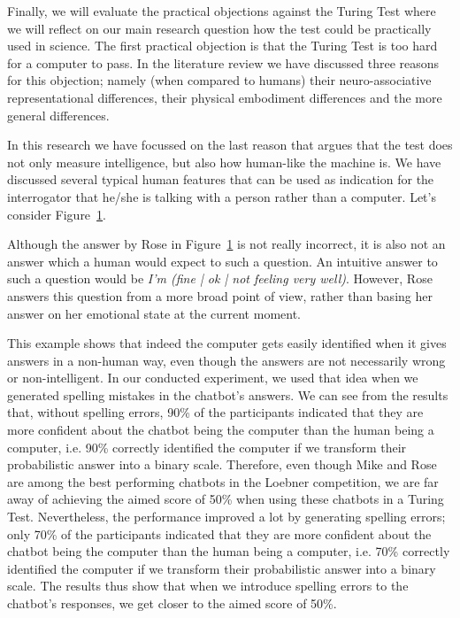 Finally, we will evaluate the practical objections against the Turing Test where we will reflect on our main research question how the test could be practically used in science. The first practical objection is that the Turing Test is too hard for a computer to pass. In the literature review we have discussed three reasons for this objection; namely (when compared to humans) their neuro-associative representational differences, their physical embodiment differences and the more general differences.

In this research we have focussed on the last reason that argues that the test does not only measure intelligence, but also how human-like the machine is. We have discussed several typical human features that can be used as indication for the interrogator that he/she is talking with a person rather than a computer. Let’s consider Figure~\ref{Example3}.

\begin{figure}[ht]
   \begin{center}
   \end{center}
   \caption{}
   \label{Example3}
\end{figure}

Although the answer by Rose in Figure~\ref{Example3} is not really incorrect, it is also not an answer which a human would expect to such a question. An intuitive answer to such a question would be \textit{I'm (fine | ok | not feeling very well)}. However, Rose answers this question from a more broad point of view, rather than basing her answer on her emotional state at the current moment.

This example shows that indeed the computer gets easily identified when it gives answers in a non-human way, even though the answers are not necessarily wrong or non-intelligent. In our conducted experiment, we used that idea when we generated spelling mistakes in the chatbot’s answers. We can see from the results that, without spelling errors, 90\% of the participants indicated that they are more confident about the chatbot being the computer than the human being a computer, i.e. 90\% correctly identified the computer if we transform their probabilistic answer into a binary scale. Therefore, even though Mike and Rose are among the best performing chatbots in the Loebner competition, we are far away of achieving the aimed score of 50\% when using these chatbots in a Turing Test. Nevertheless, the performance improved a lot by generating spelling errors; only 70\% of the participants  indicated that they are more confident about the chatbot being the computer than the human being a computer, i.e. 70\% correctly identified the computer if we transform their probabilistic answer into a binary scale. The results thus show that when we introduce spelling errors to the chatbot’s responses, we get closer to the aimed score of 50\%.

